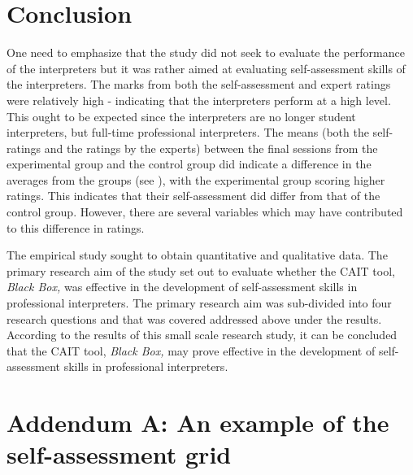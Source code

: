 \documentclass[output=paper]{langsci/langscibook}
\begin{document}
\section{Conclusion}

One need to emphasize that the study did not seek to evaluate the performance of the interpreters but it was rather aimed at evaluating self-assessment skills of the interpreters. The marks from both the self-assessment and expert ratings were relatively high -  indicating that the interpreters perform at a high level. This ought to be expected since the interpreters are no longer student interpreters, but full-time professional interpreters. The means (both the self-ratings and the ratings by the experts) between the final sessions from the experimental group and the control group did indicate a difference in the averages from the groups (see ), with the experimental group scoring higher ratings. This indicates that their self-assessment did differ from that of the control group. However, there are several variables which may have contributed to this difference in ratings.  

The empirical study sought to obtain quantitative and qualitative data. The primary research aim of the study set out to evaluate whether the \textsc{CAIT} tool, \textit{Black Box,} was effective in the development of self-assessment skills in professional interpreters. The primary research aim was sub-divided into four research questions and that was covered addressed above under the results. According to the results of this small scale research study, it can be concluded that the \textsc{CAIT} tool, \textit{Black Box,} may prove effective in the development of self-assessment skills in professional interpreters. 


\section*{Addendum A: An example of the self-assessment grid}
\label{03:addendum:A}
\renewcommand{\arraystretch}{2}
\newlength{\tablewidth}\setlength{\tablewidth}{20cm}
\newlength{\cellwidth}\setlength{\cellwidth}{0.033\tablewidth}
\newlength{\rowwidth}\setlength{\rowwidth}{30\cellwidth}
\end{document}
